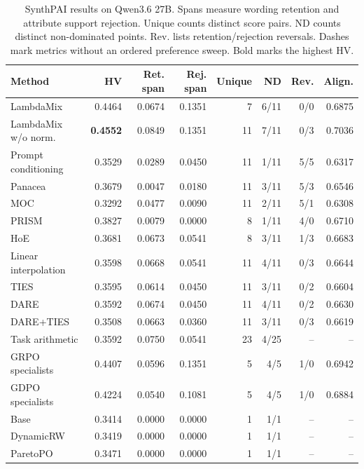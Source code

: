 \begin{table}[htbp]
\centering\small
\setlength{\tabcolsep}{3pt}
\caption{SynthPAI results on Qwen3.6 27B. Spans measure wording retention and attribute support rejection. Unique counts distinct score pairs. ND counts distinct non-dominated points. Rev. lists retention/rejection reversals. Dashes mark metrics without an ordered preference sweep. Bold marks the highest HV.}
\label{tab:full-synthpai-q27}
\begin{tabular}{@{}lrrrrrrr@{}}
\toprule
Method & HV & Ret. span & Rej. span & Unique & ND & Rev. & Align.\\
\midrule
LambdaMix & 0.4464 & 0.0674 & 0.1351 & 7 & 6/11 & 0/0 & 0.6875\\
LambdaMix w/o norm. & \textbf{0.4552} & 0.0849 & 0.1351 & 11 & 7/11 & 0/3 & 0.7036\\
\midrule
Prompt conditioning & 0.3529 & 0.0289 & 0.0450 & 11 & 1/11 & 5/5 & 0.6317\\
Panacea & 0.3679 & 0.0047 & 0.0180 & 11 & 3/11 & 5/3 & 0.6546\\
MOC & 0.3292 & 0.0477 & 0.0090 & 11 & 2/11 & 5/1 & 0.6308\\
PRISM & 0.3827 & 0.0079 & 0.0000 & 8 & 1/11 & 4/0 & 0.6710\\
HoE & 0.3681 & 0.0673 & 0.0541 & 8 & 3/11 & 1/3 & 0.6683\\
\midrule
Linear interpolation & 0.3598 & 0.0668 & 0.0541 & 11 & 4/11 & 0/3 & 0.6644\\
TIES & 0.3595 & 0.0614 & 0.0450 & 11 & 3/11 & 0/2 & 0.6604\\
DARE & 0.3592 & 0.0674 & 0.0450 & 11 & 4/11 & 0/2 & 0.6630\\
DARE+TIES & 0.3508 & 0.0663 & 0.0360 & 11 & 3/11 & 0/3 & 0.6619\\
Task arithmetic & 0.3592 & 0.0750 & 0.0541 & 23 & 4/25 & -- & --\\
\midrule
GRPO specialists & 0.4407 & 0.0596 & 0.1351 & 5 & 4/5 & 1/0 & 0.6942\\
GDPO specialists & 0.4224 & 0.0540 & 0.1081 & 5 & 4/5 & 1/0 & 0.6884\\
\midrule
Base & 0.3414 & 0.0000 & 0.0000 & 1 & 1/1 & -- & --\\
DynamicRW & 0.3419 & 0.0000 & 0.0000 & 1 & 1/1 & -- & --\\
ParetoPO & 0.3471 & 0.0000 & 0.0000 & 1 & 1/1 & -- & --\\
\bottomrule
\end{tabular}
\end{table}